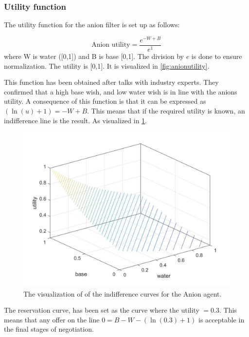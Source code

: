 \subsubsection{Utility function}
The utility function for the anion filter is set up as follows:

\[
\text{Anion utility} = \frac{e^{-W+B}}{e^1}
\]
where W is water ([0,1]) and B is base [0,1]. The division by $e$ is done to ensure normalization. The utility is [0,1]. It is visualized in \cref{fig:anionutility}.

This function has been obtained after talks with industry experts. They confirmed that a high base wish, and low water wish is in line with the anions utility. A consequence of this function is that it can be expressed as $ (\ln(u)+1) = -W+B$. This means that if the required utility is known, an indifference line is the result. As visualized in \cref{fig:anionutilitycontour}.

\begin{figure}[h]
	\centering
	\includegraphics[width=0.7\linewidth]{img/Anion_utility_contour}
	\caption{The visualization of of the indifference curves for the Anion agent.}
	\label{fig:anionutilitycontour}
\end{figure}

The reservation curve, has been set as the curve where the utility $= 0.3$. This means that any offer on the line $0 = B - W - (\ln(0.3)+1)$ is acceptable in the final stages of negotiation.


